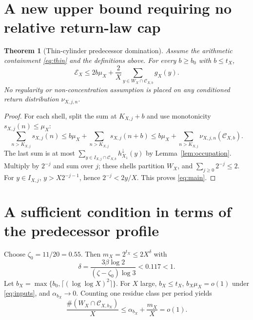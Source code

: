 \documentclass[11pt,a4paper]{article}
\newtheorem{theorem}{Theorem}
\newcommand{\EX}{\mathcal E_X}
\newcommand{\1}{\mathbf 1}
\begin{document}
\section{A new upper bound requiring no relative return-law cap}
\begin{theorem}[Thin-cylinder predecessor domination]\label{thm:main}
Assume the arithmetic containment \eqref{eq:thin} and the definitions above. For every $b\ge b_0$ with $b\le t_X$,
\begin{equation}\label{eq:main}
 \boxed{\quad
 \EX\le 2b\mu_X+
 \frac2X\sum_{y\in W_X\cap\mathcal C_{X,b}}g_X(y).
 \quad}
\end{equation}
No regularity or non-concentration assumption is placed on any conditioned return distribution $\nu_{X,j,n}$.
\end{theorem}
\begin{proof}
For each shell, split the sum at $K_{X,j}+b$ and use monotonicity $s_{X,j}(n)\le\mu_X$:
\[
 \sum_{n>K_{X,j}}s_{X,j}(n)
 \le b\mu_X+\sum_{n>K_{X,j}}s_{X,j}(n+b)
 \le b\mu_X+\sum_{n>K_{X,j}}\nu_{X,j,n}(\mathcal C_{X,b}).
\]
The last sum is at most $\sum_{y\in I_{X,j}\cap\mathcal C_{X,b}} h^{\downarrow}_{X_1}(y)$ by Lemma~\ref{lem:occupation}. Multiply by $2^{-j}$ and sum over $j$; these shells partition $W_X$, and $\sum_{j\ge0}2^{-j}\le2$. For $y\in I_{X,j}$, $y>X2^{-j-1}$, hence $2^{-j}<2y/X$. This proves \eqref{eq:main}.
\end{proof}

\section{A sufficient condition in terms of the predecessor profile}
Choose $\zeta_0=11/20=0.55$. Then $m_X=2^{t_X}\le2X^{\delta}$ with
\[
 \delta=\frac{3\beta\log2}{(\zeta-\zeta_0)\log3}<0.117<1.
\]
Let $b_X=\max\{b_0,\lceil(\log\log X)^2\rceil\}$. For $X$ large, $b_X\le t_X$, $b_X\mu_X=o(1)$ under \eqref{eq:inputs}, and $\alpha_{b_X}\to0$. Counting one residue class per period yields
\begin{equation}\label{eq:sparse}
 \frac{\#(W_X\cap\mathcal C_{X,b_X})}{X}
 \le\alpha_{b_X}+\frac{m_X}{X}=o(1).
\end{equation}
\end{document}
